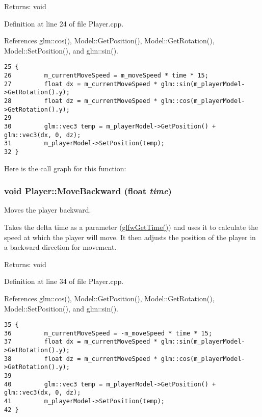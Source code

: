 \begin{Desc}
\item[Returns:]void \end{Desc}


Definition at line 24 of file Player.cpp.

References glm::cos(), Model::GetPosition(), Model::GetRotation(), Model::SetPosition(), and glm::sin().

\begin{Code}\begin{verbatim}25 {
26         m_currentMoveSpeed = m_moveSpeed * time * 15;
27         float dx = m_currentMoveSpeed * glm::sin(m_playerModel->GetRotation().y);
28         float dz = m_currentMoveSpeed * glm::cos(m_playerModel->GetRotation().y);
29 
30         glm::vec3 temp = m_playerModel->GetPosition() + glm::vec3(dx, 0, dz);
31         m_playerModel->SetPosition(temp);
32 }
\end{verbatim}
\end{Code}




Here is the call graph for this function:\hypertarget{class_player_0de705c108e85cf8609ac827319fe11b}{
\subsubsection[MoveBackward]{\setlength{\rightskip}{0pt plus 5cm}void Player::MoveBackward (float {\em time})}}
\label{class_player_0de705c108e85cf8609ac827319fe11b}


Moves the player backward. 

Takes the delta time as a parameter (\hyperlink{group__input_g03d4a1039b8662c71eeb40beea8cb622}{glfwGetTime()}) and uses it to calculate the speed at which the player will move. It then adjusts the position of the player in a backward direction for movement.

\begin{Desc}
\item[Returns:]void \end{Desc}


Definition at line 34 of file Player.cpp.

References glm::cos(), Model::GetPosition(), Model::GetRotation(), Model::SetPosition(), and glm::sin().

\begin{Code}\begin{verbatim}35 {
36         m_currentMoveSpeed = -m_moveSpeed * time * 15;
37         float dx = m_currentMoveSpeed * glm::sin(m_playerModel->GetRotation().y);
38         float dz = m_currentMoveSpeed * glm::cos(m_playerModel->GetRotation().y);
39 
40         glm::vec3 temp = m_playerModel->GetPosition() + glm::vec3(dx, 0, dz);
41         m_playerModel->SetPosition(temp);
42 }
\end{verbatim}
\end{Code}




